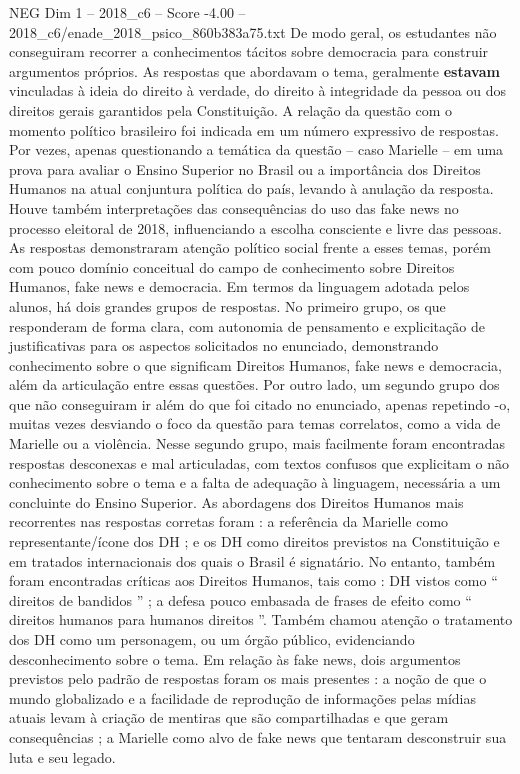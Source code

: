 \begin{textsample}{NEG Dim 1 – 2018\_c6 – Score -4.00 – 2018\_c6/enade\_2018\_psico\_860b383a75.txt}
De modo geral, os estudantes não conseguiram recorrer a conhecimentos tácitos sobre democracia para construir argumentos próprios.
As respostas que abordavam o tema, geralmente \textbf{estavam} vinculadas à ideia do direito à verdade, do direito à integridade da pessoa ou dos direitos gerais garantidos pela Constituição.
A relação da questão com o momento político brasileiro foi indicada em um número expressivo de respostas.
Por vezes, apenas questionando a temática da questão – caso Marielle – em uma prova para avaliar o Ensino Superior no Brasil ou a importância dos Direitos Humanos na atual conjuntura política do país, levando à anulação da resposta.
Houve também interpretações das consequências do uso das fake news no processo eleitoral de 2018, influenciando a escolha consciente e livre das pessoas.
As respostas demonstraram atenção político social frente a esses temas, porém com pouco domínio conceitual do campo de conhecimento sobre Direitos Humanos, fake news e democracia.
Em termos da linguagem adotada pelos alunos, há dois grandes grupos de respostas.
No primeiro grupo, os que responderam de forma clara, com autonomia de pensamento e explicitação de justificativas para os aspectos solicitados no enunciado, demonstrando conhecimento sobre o que significam Direitos Humanos, fake news e democracia, além da articulação entre essas questões.
Por outro lado, um segundo grupo dos que não conseguiram ir além do que foi citado no enunciado, apenas repetindo -o, muitas vezes desviando o foco da questão para temas correlatos, como a vida de Marielle ou a violência.
Nesse segundo grupo, mais facilmente foram encontradas respostas desconexas e mal articuladas, com textos confusos que explicitam o não conhecimento sobre o tema e a falta de adequação à linguagem, necessária a um concluinte do Ensino Superior.
As abordagens dos Direitos Humanos mais recorrentes nas respostas corretas foram : a referência da Marielle como representante/ícone dos DH ; e os DH como direitos previstos na Constituição e em tratados internacionais dos quais o Brasil é signatário.
No entanto, também foram encontradas críticas aos Direitos Humanos, tais como : DH vistos como “ direitos de bandidos ” ; a defesa pouco embasada de frases de efeito como “ direitos humanos para humanos direitos ”.
Também chamou atenção o tratamento dos DH como um personagem, ou um órgão público, evidenciando desconhecimento sobre o tema.
Em relação às fake news, dois argumentos previstos pelo padrão de respostas foram os mais presentes : a noção de que o mundo globalizado e a facilidade de reprodução de informações pelas mídias atuais levam à criação de mentiras que são compartilhadas e que geram consequências ; a Marielle como alvo de fake news que tentaram desconstruir sua luta e seu legado.

\end{textsample}
